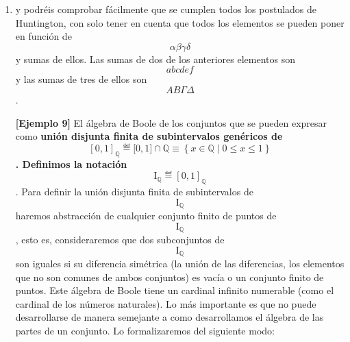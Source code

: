 \begin{enumerate}
\def\labelenumi{\arabic{enumi}.}
\setcounter{enumi}{2}
\item
  y podréis comprobar fácilmente que se cumplen todos los postulados de
  Huntington, con solo tener en cuenta que todos los elementos se pueden
  poner en función de \[\alpha\beta\gamma\delta\]y sumas de ellos. Las
  sumas de dos de los anteriores elementos son \[abcdef\]y las sumas de
  tres de ellos son \[ΑΒ\Gamma\Delta\].

  \textbf{{[}Ejemplo 9{]}} El álgebra de Boole de los conjuntos que se
  pueden expresar como \textbf{unión dis\-junta finita de subintervalos
  genéricos de
  \[\left\lbrack {0,1} \right\rbrack_{\mathbb{Q}}≝{{\lbrack 0,1\rbrack \cap {\mathbb{Q}}} \equiv \left\{ {x \in {\mathbb{Q}} \mid 0 \leq x \leq 1} \right\}}\].
  Definimos la notación
  \[\mathbf{\mathrm{I}}_{\mathbb{Q}}≝\left\lbrack {0,1} \right\rbrack_{\mathbb{Q}}\]}.
  Para definir la unión disjunta finita de subintervalos de
  \[\mathbf{\mathrm{I}}_{\mathbb{Q}}\] haremos abs\-tracción de
  cualquier conjunto finito de puntos de
  \textbf{\[\mathbf{\mathrm{I}}_{\mathbb{Q}}\]}, esto es, consideraremos
  que dos subconjuntos de \[\mathbf{\mathrm{I}}_{\mathbb{Q}}\] son
  iguales si su diferencia simétrica (la unión de las diferencias, los
  elementos que no son comunes de ambos conjuntos) es vacía o un
  conjunto finito de puntos. Este álgebra de Boole tiene un cardinal
  infinito numerable (como el cardinal de los números naturales). Lo más
  importante es que no puede desarrollarse de manera semejante a como
  desarrolla\-mos el álgebra de las partes de un conjunto. Lo
  formalizaremos del siguiente modo:


\end{enumerate}
